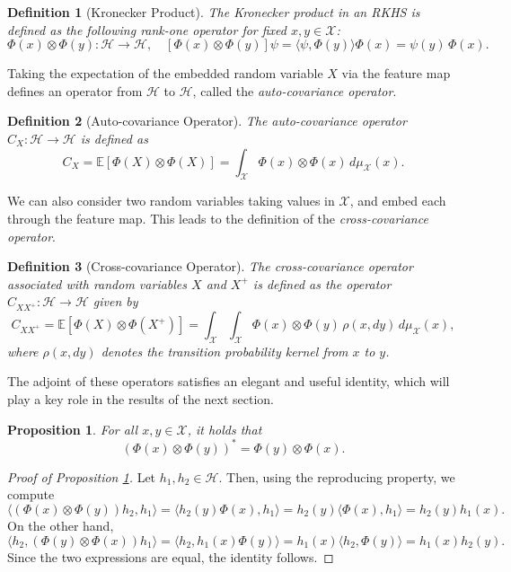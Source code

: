 \documentclass{article}
\newcommand{\E}{\mathbb{E}} %
\newtheorem{defn}{Definition}
\newtheorem{prop}{Proposition}
\renewcommand{\H}{\mathcal{H}}
\newcommand{\X}{\mathcal{X}}
\begin{document}
\begin{defn}[Kronecker Product]
The Kronecker product in an RKHS is defined as the following rank-one operator for fixed \( x, y \in \X \):
\[
\Phi(x) \otimes \Phi(y) : \H \to \H, \quad 
[\Phi(x) \otimes \Phi(y)] \psi = \langle \psi, \Phi(y) \rangle \Phi(x) = \psi(y)\, \Phi(x).
\]
\end{defn}

Taking the expectation of the embedded random variable \( X \) via the feature map defines an operator from \( \H \) to \( \H \), called the \textit{auto-covariance operator}.

\begin{defn}[Auto-covariance Operator]
The auto-covariance operator \( C_X : \H \to \H \) is defined as
\[
C_X = \E[\Phi(X) \otimes \Phi(X)] = \int_{\X} \Phi(x) \otimes \Phi(x) \, d\mu_\X(x).
\]
\end{defn}

We can also consider two random variables taking values in \( \X \), and embed each through the feature map. This leads to the definition of the \textit{cross-covariance operator}.

\begin{defn}[Cross-covariance Operator]
The cross-covariance operator associated with random variables \( X \) and \( X^+ \) is defined as the operator \( C_{XX^+} : \H \to \H \) given by
\[
C_{XX^+} = \mathbb{E} [\Phi(X) \otimes \Phi(X^+)] = \int_{\X} \int_{\X} \Phi(x) \otimes \Phi(y) \, \rho(x, dy) \, d\mu_\X(x),
\]
where \( \rho(x, dy) \) denotes the transition probability kernel from \( x \) to \( y \).
\end{defn}

The adjoint of these operators satisfies an elegant and useful identity, which will play a key role in the results of the next section.

\begin{prop} \label{prop:self_adjoint_kron}
For all \( x, y \in \X \), it holds that
\[
\left( \Phi(x) \otimes \Phi(y) \right)^* = \Phi(y) \otimes \Phi(x).
\]
\end{prop}

\begin{proof}[Proof of Proposition \ref{prop:self_adjoint_kron}]
Let \( h_1, h_2 \in \H \). Then, using the reproducing property, we compute
\[
\langle (\Phi(x) \otimes \Phi(y)) h_2, h_1 \rangle = \langle h_2(y) \Phi(x), h_1 \rangle = h_2(y) \langle \Phi(x), h_1 \rangle = h_2(y) h_1(x).
\]
On the other hand,
\[
\langle h_2, (\Phi(y) \otimes \Phi(x)) h_1 \rangle = \langle h_2, h_1(x) \Phi(y) \rangle = h_1(x) \langle h_2, \Phi(y) \rangle = h_1(x) h_2(y).
\]
Since the two expressions are equal, the identity follows.
\end{proof}
\end{document}
